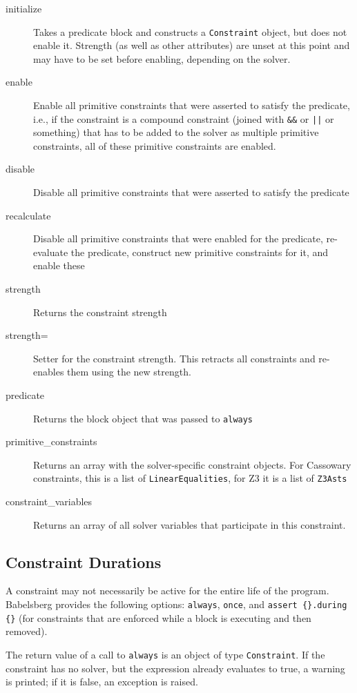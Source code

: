 \documentclass[11pt]{article}
\begin{document}
\begin{description}
\item[initialize] Takes a predicate block and constructs a
  \lstinline{Constraint} object, but does not enable it. Strength (as
  well as other attributes) are unset at this point and may have to be
  set before enabling, depending on the solver.
\item[enable] Enable all primitive constraints that were asserted to
  satisfy the predicate, i.e., if the constraint is a compound
  constraint (joined with \lstinline{&&} or \lstinline{||} or
  something) that has to be added to the solver as multiple primitive
  constraints, all of these primitive constraints are enabled.
\item[disable] Disable all primitive constraints that were asserted to
  satisfy the predicate
\item[recalculate] Disable all primitive constraints that were enabled
  for the predicate, re-evaluate the predicate, construct new
  primitive constraints for it, and enable these
\item[strength] Returns the constraint strength
\item[strength=] Setter for the constraint strength. This retracts all
  constraints and re-enables them using the new strength.
\item[predicate] Returns the block object that was passed to
  \lstinline{always}
\item[primitive\_constraints] Returns an array with the
  solver-specific constraint objects. For Cassowary constraints, this
  is a list of \lstinline{LinearEqualities}, for Z3 it is a list of
  \lstinline{Z3Asts}
\item[constraint\_variables] Returns an array of all solver variables
  that participate in this constraint.
\end{description}

\subsection{Constraint Durations}
\label{sec:constraint-durations}

A constraint may not necessarily be active for the entire life of the
program.  Babelsberg provides the following options:
\lstinline{always}, \lstinline{once}, and
\lstinline!assert {}.during {}! (for constraints that are enforced
while a block is executing and then removed).

The return value of a call to \lstinline{always} is an object of type
\lstinline{Constraint}. If the constraint has no solver, but the
expression already evaluates to true, a warning is printed; if it is
false, an exception is raised.
\end{document}
